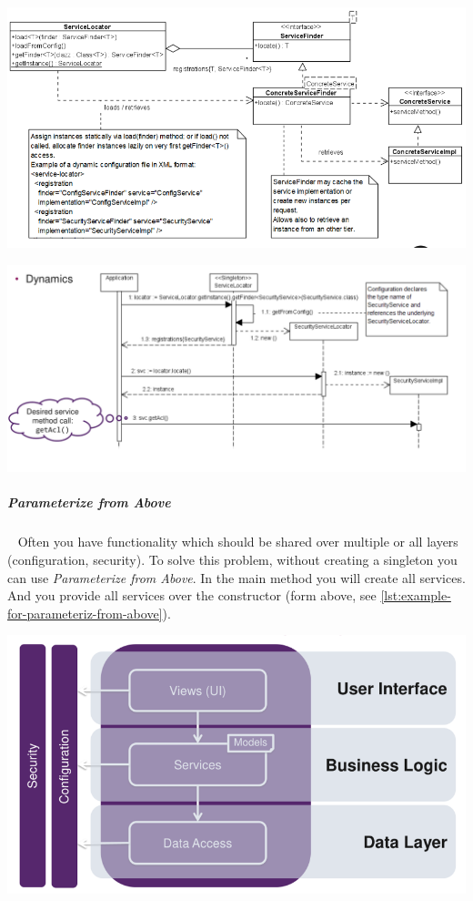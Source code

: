 \documentclass[11pt,twoside,landscape]{article}
\begin{document}
\begin{multicols}{3}
{
\begin{center}
\includegraphics[width=.9\linewidth]{img/service_locator.png}
\end{center}
\label{fig:service-locator-uml}
}

{
\begin{center}
\includegraphics[width=.9\linewidth]{img/service_locator_dynamics.png}
\end{center}
\label{fig:service-locator-dynamics}
}

\subparagraph{Parameterize from Above} \
\label{sec:org655db05}
Often you have functionality which should be shared over multiple or all layers (configuration, security).
To solve this problem, without creating a singleton you can use \emph{Parameterize from Above}.
In the main method you will create all services.
And you provide all services over the constructor (form above, see \autoref{lst:example-for-parameteriz-from-above}).

{
\begin{center}
\includegraphics[width=.9\linewidth]{img/vertical_and_horizontal_layering.png}
\end{center}
\label{fig:horizontal-and-vertical-layering}
}


\end{multicols}
\end{document}
